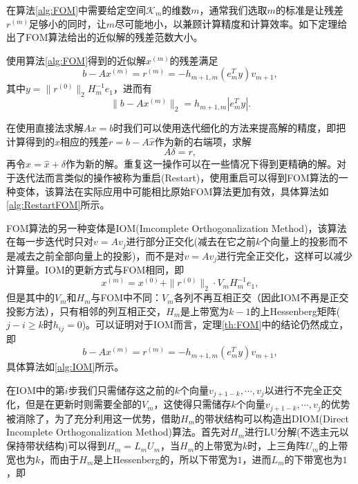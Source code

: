 \documentclass[a4paper,10pt]{ctexart}
\begin{document}
在算法\ref{alg:FOM}中需要给定空间$ \mathcal{K}_m $的维数$ m $，通常我们选取$ m $的标准是让残差$ r^{(m)} $足够小的同时，让$ m $尽可能地小，以兼顾计算精度和计算效率。如下定理给出了FOM算法给出的近似解的残差范数大小。
\begin{theorem}\label{th:FOM}
    使用算法\ref{alg:FOM}得到的近似解$ x^{(m)} $的残差满足
    \begin{equation}
        b - A x^{(m)} = r^{(m)} = -h_{m+1,m}(e^T_m y) v_{m+1},
    \end{equation}
    其中$ y = \| r^{(0)} \|_2 H_m^{-1}e_1 $，进而有
    \begin{equation}
        \| b-Ax^{(m)} \|_2 = h_{m+1,m} |e_m^T y|.
    \end{equation}
\end{theorem}

在使用直接法求解$ Ax=b $时我们可以使用迭代细化的方法来提高解的精度，即把计算得到的$ \hat{x} $相应的残差$ r = b-A\hat{x} $作为新的右端项，求解
\[
    A \delta = r,
\]
再令$ x = \hat{x}+\delta $作为新的解。重复这一操作可以在一些情况下得到更精确的解。对于迭代法而言类似的操作被称为重启(Restart)，使用重启可以得到FOM算法的一种变体，该算法在实际应用中可能相比原始FOM算法更加有效，具体算法如\ref{alg:RestartFOM}所示。

FOM算法的另一种变体是IOM(Imcomplete Orthogonalization Method)，该算法在每一步迭代时只对$ v = Av_j $进行部分正交化(减去在它之前$ k $个向量上的投影而不是减去之前全部向量上的投影)，而不是对$ v = Av_j $进行完全正交化，这样可以减少计算量。IOM的更新方式与FOM相同，即
\[
    x^{(m)} = x^{(0)} + \| r^{(0)} \|_2 \cdot V_m H_m^{-1}e_1 ,
\]
但是其中的$ V_m $和$ H_m $与FOM中不同：$ V_m $各列不再互相正交（因此IOM不再是正交投影方法），只有相邻的列互相正交，$ H_m $是上带宽为$ k-1 $的上Hessenberg矩阵($ j-i\geqslant k $时$ h_{ij}=0 $)。可以证明对于IOM而言，定理\ref{th:FOM}中的结论仍然成立，即
\[
    b - Ax^{(m)} = r^{(m)} = -h_{m+1,m}(e^T_m y) v_{m+1},
\]
具体算法如\ref{alg:IOM}所示。

在IOM中的第$ i $步我们只需储存这之前的$ k $个向量$ v_{j+1-k},\cdots ,v_j $以进行不完全正交化，但是在更新时则需要全部的$ V_m $，这使得只需储存$ k $个向量$ v_{j+1-k},\cdots ,v_j $的优势被消除了，为了充分利用这一优势，借助$ H_m $的带状结构可以构造出DIOM(Direct Incomplete Orthogonalization Method)算法。首先对$ H_m $进行LU分解(不选主元以保持带状结构)可以得到$ H_m = L_mU_m $，当$ H_m $的上带宽为$ k $时，上三角阵$ U_m $的上带宽也为$ k $，而由于$ H_m $是上Hessenberg的，所以下带宽为$ 1 $，进而$ L_m $的下带宽也为$ 1 $，即
\end{document}
